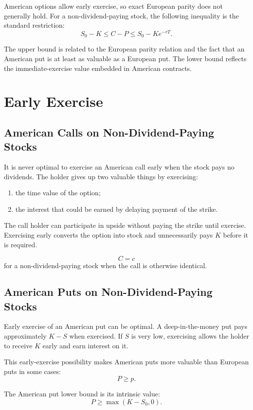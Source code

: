 American options allow early exercise, so exact European parity does not
generally hold. For a non-dividend-paying stock, the following inequality is the
standard restriction:
\[
    S_0-K \leq C-P \leq S_0-K e^{-rT}.
\]

The upper bound is related to the European parity relation and the fact that an
American put is at least as valuable as a European put. The lower bound reflects
the immediate-exercise value embedded in American contracts.

\section{Early Exercise}

\subsection{American Calls on Non-Dividend-Paying Stocks}

It is never optimal to exercise an American call early when the stock pays no
dividends. The holder gives up two valuable things by exercising:
\begin{enumerate}
    \item the time value of the option;
    \item the interest that could be earned by delaying payment of the strike.
\end{enumerate}

The call holder can participate in upside without paying the strike until
exercise. Exercising early converts the option into stock and unnecessarily pays
$K$ before it is required.

\[
    C = c
\]
for a non-dividend-paying stock when the call is otherwise identical.

\subsection{American Puts on Non-Dividend-Paying Stocks}

Early exercise of an American put can be optimal. A deep-in-the-money put pays
approximately $K-S$ when exercised. If $S$ is very low, exercising allows the
holder to receive $K$ early and earn interest on it.

This early-exercise possibility makes American puts more valuable than European
puts in some cases:
\[
    P \geq p.
\]

The American put lower bound is its intrinsic value:
\[
    P \geq \max(K-S_0,0).
\]

